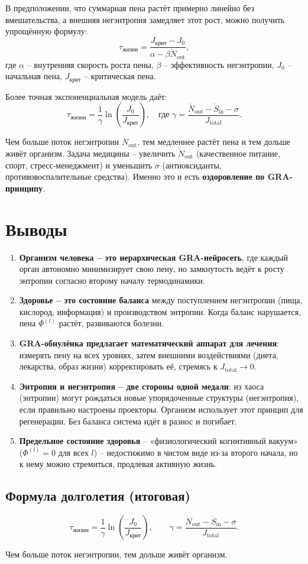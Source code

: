 \documentclass[12pt,a4paper]{article}
\begin{document}
В предположении, что суммарная пена растёт примерно линейно без вмешательства, а внешняя негэнтропия замедляет этот рост, можно получить упрощённую формулу:
\[
\tau_{\text{жизни}} = \frac{J_{\text{крит}} - J_0}{\alpha - \beta \dot{N}_{\text{out}}},
\]
где \(\alpha\) – внутренняя скорость роста пены, \(\beta\) – эффективность негэнтропии, \(J_0\) – начальная пена, \(J_{\text{крит}}\) – критическая пена.

Более точная экспоненциальная модель даёт:
\[
\boxed{\tau_{\text{жизни}} = \frac{1}{\gamma} \ln \left( \frac{J_0}{J_{\text{крит}}} \right), \quad \text{где } \gamma = \frac{\dot{N}_{\text{out}} - \dot{S}_{\text{in}} - \sigma}{J_{\text{total}}}.}
\]

Чем больше поток негэнтропии \(\dot{N}_{\text{out}}\), тем медленнее растёт пена и тем дольше живёт организм. Задача медицины – увеличить \(\dot{N}_{\text{out}}\) (качественное питание, спорт, стресс-менеджмент) и уменьшить \(\sigma\) (антиоксиданты, противовоспалительные средства). Именно это и есть \textbf{оздоровление по GRA-принципу}.

\section{Выводы}

\begin{enumerate}
    \item \textbf{Организм человека – это иерархическая GRA-нейросеть}, где каждый орган автономно минимизирует свою пену, но замкнутость ведёт к росту энтропии согласно второму началу термодинамики.
    \item \textbf{Здоровье – это состояние баланса} между поступлением негэнтропии (пища, кислород, информация) и производством энтропии. Когда баланс нарушается, пена \(\Phi^{(l)}\) растёт, развиваются болезни.
    \item \textbf{GRA-обнулёнка предлагает математический аппарат для лечения}: измерять пену на всех уровнях, затем внешними воздействиями (диета, лекарства, образ жизни) корректировать её, стремясь к \(J_{\text{total}} \to 0\).
    \item \textbf{Энтропия и негэнтропия – две стороны одной медали}: из хаоса (энтропии) могут рождаться новые упорядоченные структуры (негэнтропия), если правильно настроены проекторы. Организм использует этот принцип для регенерации. Без баланса система идёт в разнос и погибает.
    \item \textbf{Предельное состояние здоровья} – «физиологический когнитивный вакуум» (\(\Phi^{(l)} = 0\) для всех \(l\)) – недостижимо в чистом виде из-за второго начала, но к нему можно стремиться, продлевая активную жизнь.
\end{enumerate}

\subsection*{Формула долголетия (итоговая)}
\[
\boxed{\tau_{\text{жизни}} = \frac{1}{\gamma} \ln \left( \frac{J_0}{J_{\text{крит}}} \right), \qquad \gamma = \frac{\dot{N}_{\text{out}} - \dot{S}_{\text{in}} - \sigma}{J_{\text{total}}}.}
\]

Чем больше поток негэнтропии, тем дольше живёт организм.
\end{document}
